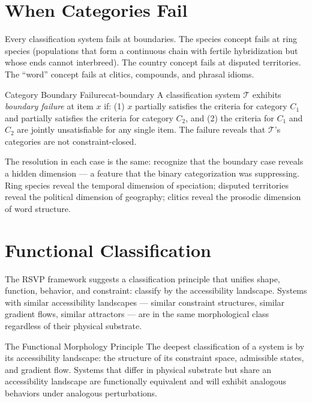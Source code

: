 \section{When Categories Fail}

Every classification system fails at boundaries. The species concept
fails at ring species (populations that form a continuous chain with
fertile hybridization but whose ends cannot interbreed). The
country concept fails at disputed territories. The ``word'' concept
fails at clitics, compounds, and phrasal idioms.

\begin{definition}{Category Boundary Failure}{cat-boundary}
  A classification system $\mathcal{T}$ exhibits \emph{boundary failure}
  at item $x$ if: (1) $x$ partially satisfies the criteria for
  category $C_1$ and partially satisfies the criteria for category $C_2$,
  and (2) the criteria for $C_1$ and $C_2$ are jointly unsatisfiable
  for any single item. The failure reveals that $\mathcal{T}$'s
  categories are not constraint-closed.
\end{definition}

The resolution in each case is the same: recognize that the boundary
case reveals a hidden dimension — a feature that the binary
categorization was suppressing. Ring species reveal the temporal
dimension of speciation; disputed territories reveal the political
dimension of geography; clitics reveal the prosodic dimension of
word structure.

\section{Functional Classification}

The RSVP framework suggests a classification principle that unifies
shape, function, behavior, and constraint: classify by the accessibility
landscape. Systems with similar accessibility landscapes — similar
constraint structures, similar gradient flows, similar attractors —
are in the same morphological class regardless of their physical substrate.

\begin{namedthm}{The Functional Morphology Principle}
  The deepest classification of a system is by its accessibility
  landscape: the structure of its constraint space, admissible states,
  and gradient flow. Systems that differ in physical substrate but
  share an accessibility landscape are functionally equivalent and
  will exhibit analogous behaviors under analogous perturbations.
\end{namedthm}

